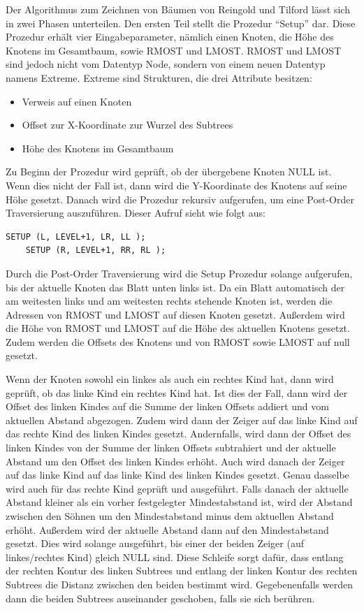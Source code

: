 Der Algorithmus zum Zeichnen von Bäumen von Reingold und Tilford lässt sich in zwei Phasen unterteilen.
Den ersten Teil stellt die Prozedur “Setup” dar. Diese Prozedur erhält vier Eingabeparameter, nämlich einen Knoten, 
die Höhe des Knotens im Gesamtbaum, sowie RMOST und LMOST. RMOST und LMOST sind jedoch nicht vom Datentyp Node, sondern 
von einem neuen Datentyp namens Extreme. Extreme sind Strukturen, die drei Attribute besitzen: 
\begin{itemize}
    \item Verweis auf einen Knoten
    \item Offset zur X-Koordinate zur Wurzel des Subtrees
    \item Höhe des Knotens im Gesamtbaum
\end{itemize}

Zu Beginn der Prozedur wird geprüft, ob der übergebene Knoten NULL ist. Wenn dies nicht der Fall ist, 
dann wird die Y-Koordinate des Knotens auf seine Höhe gesetzt. Danach wird die Prozedur rekursiv aufgerufen, 
um eine Post-Order Traversierung auszuführen. Dieser Aufruf sieht wie folgt aus:

\begin{lstlisting}[caption = Rekursiver Aufruf von Setup]
    SETUP (L, LEVEL+1, LR, LL );
    SETUP (R, LEVEL+1, RR, RL );
\end{lstlisting}

Durch die Post-Order Traversierung wird die Setup Prozedur solange aufgerufen, bis der aktuelle Knoten das Blatt unten links ist. 
Da ein Blatt automatisch der am weitesten links und am weitesten rechts stehende Knoten ist, werden die Adressen von 
RMOST und LMOST auf diesen Knoten gesetzt. Außerdem wird die Höhe von RMOST und LMOST auf die Höhe des aktuellen Knotens gesetzt. 
Zudem werden die Offsets des Knotens und von RMOST sowie LMOST auf null gesetzt. 

Wenn der Knoten sowohl ein linkes als auch ein rechtes Kind hat, dann wird geprüft, ob das linke Kind ein rechtes Kind hat. 
Ist dies der Fall, dann wird der Offset des linken Kindes auf die Summe der linken Offsets addiert und vom aktuellen Abstand abgezogen. 
Zudem wird dann der Zeiger auf das linke Kind auf das rechte Kind des linken Kindes gesetzt. Andernfalls, wird dann der Offset des linken 
Kindes von der Summe der linken Offsets subtrahiert und der aktuelle Abstand um den Offset des linken Kindes erhöht. Auch wird danach der 
Zeiger auf das linke Kind auf das linke Kind des linken Kindes gesetzt. Genau dasselbe wird auch für das rechte Kind geprüft und ausgeführt. 
Falls danach der aktuelle Abstand kleiner als ein vorher festgelegter Mindestabstand ist, wird der Abstand zwischen den Söhnen um den 
Mindestabstand minus dem aktuellen Abstand erhöht. Außerdem wird der aktuelle Abstand dann auf den Mindestabstand gesetzt. Dies wird solange 
ausgeführt, bis einer der beiden Zeiger (auf linkes/rechtes Kind) gleich NULL sind. Diese Schleife sorgt dafür, dass entlang der rechten 
Kontur des linken Subtrees und entlang der linken Kontur des rechten Subtrees die Distanz zwischen den beiden bestimmt wird. 
Gegebenenfalls werden dann die beiden Subtrees auseinander geschoben, falls sie sich berühren. \cite{q2}

